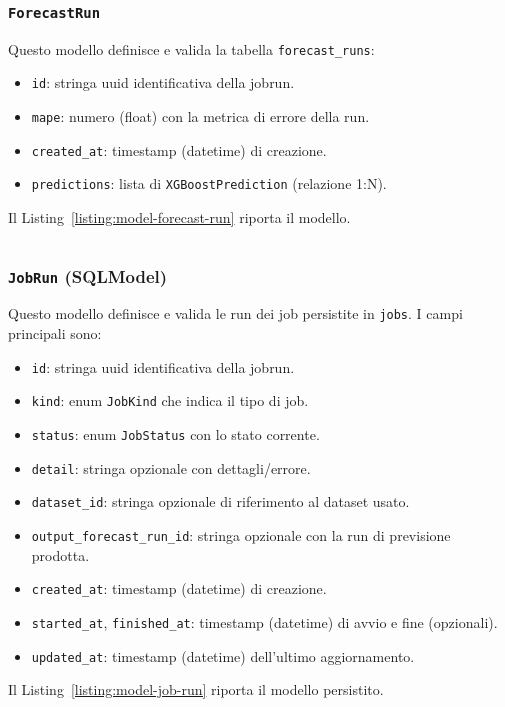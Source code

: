 \subsubsection{\texttt{ForecastRun}}
Questo modello definisce e valida la tabella \texttt{forecast\_runs}:
\begin{itemize}
    \item \texttt{id}: stringa \acrshort{uuid} identificativa della \gls{jobrun}.
    \item \texttt{mape}: numero (float) con la metrica di errore della run.
    \item \texttt{created\_at}: timestamp (datetime) di creazione.
    \item \texttt{predictions}: lista di \texttt{XGBoostPrediction} (relazione 1:N).
\end{itemize}
Il Listing~\ref{listing:model-forecast-run} riporta il modello.
\begin{listing}[H]
\inputminted[fontsize=\small, breaklines, breakanywhere=true, linenos=true, bgcolor=gray!10]{python}{code/models/forecast_run.py}
\caption{Modello SQLModel \texttt{ForecastRun}.}
\label{listing:model-forecast-run}
\end{listing}

\subsubsection{\texttt{JobRun} (SQLModel)}
Questo modello definisce e valida le run dei job persistite in \texttt{jobs}. I campi principali sono:
\begin{itemize}
    \item \texttt{id}: stringa \acrshort{uuid} identificativa della \gls{jobrun}.
    \item \texttt{kind}: enum \texttt{JobKind} che indica il tipo di job.
    \item \texttt{status}: enum \texttt{JobStatus} con lo stato corrente.
    \item \texttt{detail}: stringa opzionale con dettagli/errore.
    \item \texttt{dataset\_id}: stringa opzionale di riferimento al dataset usato.
    \item \texttt{output\_forecast\_run\_id}: stringa opzionale con la run di previsione prodotta.
\item \texttt{created\_at}: timestamp (datetime) di creazione.
    \item \texttt{started\_at}, \texttt{finished\_at}: timestamp (datetime) di avvio e fine (opzionali).
    \item \texttt{updated\_at}: timestamp (datetime) dell’ultimo aggiornamento.
\end{itemize}
Il Listing~\ref{listing:model-job-run} riporta il modello persistito.
\captionsetup{type=listing, aboveskip=2pt, belowskip=0pt}
\inputminted[fontsize=\small, breaklines, breakanywhere=true, linenos=true, bgcolor=gray!10]{python}{code/models/job_run.py}
\label{listing:model-job-run}

